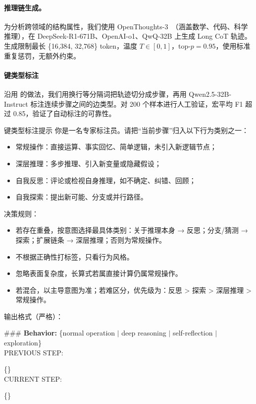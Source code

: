 \paragraph{\textbf{推理链生成。}}
为分析跨领域的结构属性，我们使用 OpenThoughts-3~\citep{guha2025openthoughts}（涵盖数学、代码、科学推理），在 DeepSeek-R1-671B、OpenAI-o1、QwQ-32B 上生成 Long CoT 轨迹。生成限制最长 \{16,384, 32,768\} token，温度 $T\in[0,1]$，top-$p=0.95$，使用标准重复惩罚，无额外约束。\vspace{-5pt}


\paragraph{\textbf{键类型标注}}
\label{append:annotation}
沿用 \citet{golovneva2023roscoe,chen2024unlocking} 的做法，我们用换行等分隔词把轨迹切分成步骤，再用 Qwen2.5-32B-Instruct 标注连续步骤之间的边类型。对 200 个样本进行人工验证，宏平均 F1 超过 0.85，验证了自动标注的可靠性。

\begin{PromptBox}{键类型标注提示}
你是一名专家标注员。请把“当前步骤”归入以下行为类别之一：
\begin{itemize}[leftmargin=16pt, itemsep=0pt, topsep=0pt]
    \item 常规操作：直接运算、事实回忆、简单逻辑，未引入新逻辑节点；
    \item 深层推理：多步推理、引入新变量或隐藏假设；
    \item 自我反思：评论或检视自身推理，如不确定、纠错、回顾；
    \item 自我探索：提出新可能、分支或并行路径。
\end{itemize}

决策规则：
\begin{itemize}[leftmargin=16pt, itemsep=0pt, topsep=0pt]
    \item[(1)] 若存在重叠，按意图选择最具体类别：关于推理本身 → 反思；分支/猜测 → 探索；扩展链条 → 深层推理；否则为常规操作。
    \item[(2)] 不根据正确性打标签，只看行为风格。
    \item[(3)] 忽略表面复杂度，长算式若属直接计算仍属常规操作。
    \item[(4)] 若混合，以主导意图为准；若难区分，优先级为：反思 > 探索 > 深层推理 > 常规操作。
\end{itemize}

输出格式（严格）：

\#\#\# \textbf{Behavior:} \{normal operation $|$ deep reasoning $|$ self-reflection $|$ exploration\}
\\

PREVIOUS STEP:

\{\}
\\
CURRENT STEP:

\{\}
\end{PromptBox}


